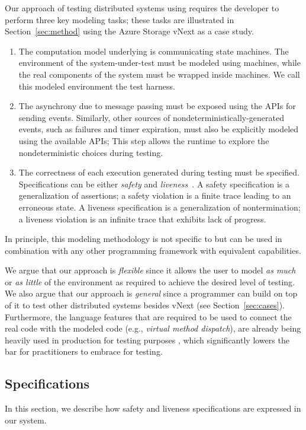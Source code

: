 Our approach of testing distributed systems using \psharp requires the developer to perform three key modeling tasks;
these tasks are illustrated in Section~\ref{sec:method} using the Azure Storage vNext as a case study.
\begin{enumerate}
\item
The computation model underlying \psharp is communicating state machines.
The environment of the system-under-test must be modeled using \psharp machines,
while the real components of the system must be wrapped inside \psharp machines.
We call this modeled environment the \psharp test harness.

\item
The asynchrony due to message passing must be exposed using the \psharp APIs for sending events.
Similarly, other sources of nondeterministically-generated events, such as failures and timer expiration,
must also be explicitly modeled using the available \psharp APIs;
This step allows the \psharp runtime to explore the nondeterministic choices during testing.

\item
The correctness of each execution generated during testing must be specified.
Specifications can be either \emph{safety} and \emph{liveness}~\cite{lamport1977proving}.
A safety specification is a generalization of assertions;
a safety violation is a finite trace leading to an erroneous state.
A liveness specification is a generalization of nontermination;
a liveness violation is an infinite trace that exhibits lack of progress.
\end{enumerate}
In principle, this modeling methodology is not specific to \psharp but can be used in combination with any other programming framework
with equivalent capabilities.

We argue that our approach is \emph{flexible} since it allows the user to model \emph{as much} or \emph{as little} of the environment as required to achieve the desired level of testing. We also argue that our approach is \emph{general} since a programmer can build on top of it to test other distributed systems besides vNext (see Section~\ref{sec:cases}). Furthermore, the language features that are required to be used to connect the real code with the modeled code (e.g., \emph{virtual method dispatch}), are already being heavily used in production for testing purposes , which significantly lowers the bar for practitioners to embrace \psharp for testing.

\subsection{Specifications}
\label{sec:bg:bugs}
In  this section, we describe how safety and liveness specifications are expressed in our system.

